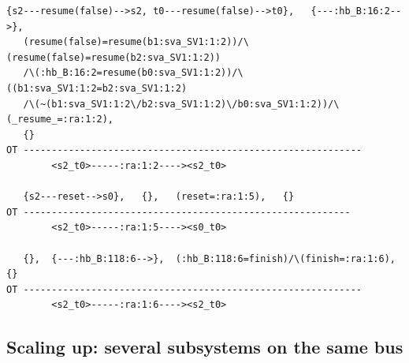 \documentclass{lncs/llncs}
\begin{document}
\begin{lstlisting}[basicstyle=\scriptsize\ttfamily, frame=single]
   {s2---resume(false)-->s2, t0---resume(false)-->t0},   {---:hb_B:16:2-->},
   (resume(false)=resume(b1:sva_SV1:1:2))/\(resume(false)=resume(b2:sva_SV1:1:2))
   /\(:hb_B:16:2=resume(b0:sva_SV1:1:2))/\((b1:sva_SV1:1:2=b2:sva_SV1:1:2)
   /\(~(b1:sva_SV1:1:2\/b2:sva_SV1:1:2)\/b0:sva_SV1:1:2))/\(_resume_=:ra:1:2),
   {}
OT ------------------------------------------------------------
        <s2_t0>-----:ra:1:2----><s2_t0>

   {s2---reset-->s0},   {},   (reset=:ra:1:5),   {}
OT ----------------------------------------------------------
        <s2_t0>-----:ra:1:5----><s0_t0>

   {},  {---:hb_B:118:6-->},  (:hb_B:118:6=finish)/\(finish=:ra:1:6),  {}
OT ------------------------------------------------------------
        <s2_t0>-----:ra:1:6----><s2_t0>
\end{lstlisting}


\subsection{Scaling up: several subsystems on the same bus}
\end{document}

